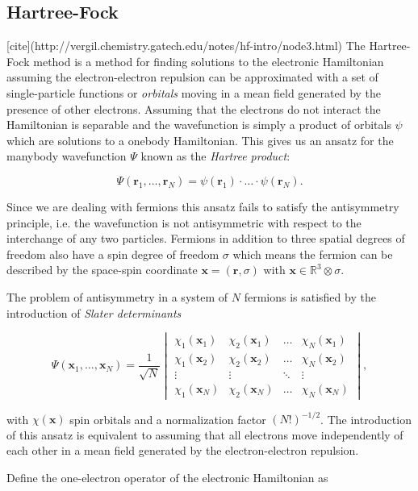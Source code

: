 \subsection{Hartree-Fock}
[cite](http://vergil.chemistry.gatech.edu/notes/hf-intro/node3.html)
The Hartree-Fock method is a method for finding
solutions to the electronic Hamiltonian assuming
the electron-electron repulsion can be approximated
with a set of single-particle functions or \textit{orbitals}
moving in a mean field generated by the presence of other electrons.
Assuming that the electrons do not interact
the Hamiltonian is separable and the wavefunction
is simply a product of orbitals $\psi$
which are solutions to a onebody Hamiltonian.
This gives us an ansatz for the manybody wavefunction $\Psi$
known as the \textit{Hartree product}:

$$ \Psi(\bm{r}_1,\dots,\bm{r}_N) = \psi(\bm{r}_1) \cdot \dots
    \cdot \psi(\bm{r}_N) . $$

Since we are dealing with fermions this ansatz fails to satisfy
the antisymmetry principle, i.e. the wavefunction
is not antisymmetric with respect to the interchange of any two
particles. Fermions in addition to three spatial degrees of freedom
also have a spin degree of freedom $\sigma$
which means the fermion can be described
by the space-spin coordinate $\bm{x} = (\bm{r}, \sigma)$
with $\bm{x} \in \mathbb{R}^3 \otimes \sigma$.
\par
The problem of antisymmetry in a system of $N$ fermions
is satisfied by the introduction of \textit{Slater determinants}

\begin{equation}
\Psi(\bm{x}_1,\dots,\bm{x}_N)
= \frac{1}{\sqrt{N}}
\begin{vmatrix}
    \chi_{1}(\bm{x}_1) & \chi_{2}(\bm{x}_1)
    & \dots & \chi_{N}(\bm{x}_1) \\
    \chi_{1}(\bm{x}_2)  & \chi_{2}(\bm{x}_2)
    & \dots & \chi_{N}(\bm{x}_2) \\
    \vdots & \vdots & \ddots & \vdots \\
    \chi_{1}(\bm{x}_N) & \chi_{2}(\bm{x}_N)
    & \dots & \chi_{N}(\bm{x}_N)
\end{vmatrix} ,
\end{equation}

with $\chi(\bm{x})$ spin orbitals and a normalization factor
$(N!)^{-1/2}$. The introduction of this ansatz is equivalent to assuming that
all electrons move independently of each other
in a mean field generated by the electron-electron repulsion.
\par
Define the one-electron operator of the electronic Hamiltonian as


